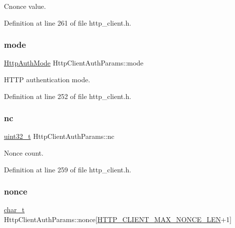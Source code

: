Cnonce value. 



Definition at line 261 of file http\+\_\+client.\+h.

\mbox{\label{structHttpClientAuthParams_add04fcf3f023b6d2ac1e38d6fd3ebe1e}} 
\subsubsection{\texorpdfstring{mode}{mode}}
{\footnotesize\ttfamily \hyperlink{http__common_8h_ad435f9e57a3351beaec6fc809eff4f31}{Http\+Auth\+Mode} Http\+Client\+Auth\+Params\+::mode}



H\+T\+TP authentication mode. 



Definition at line 252 of file http\+\_\+client.\+h.

\mbox{\label{structHttpClientAuthParams_af8657995b5e9910a6e205158eab5ada7}} 
\subsubsection{\texorpdfstring{nc}{nc}}
{\footnotesize\ttfamily \hyperlink{stdint_8h_a435d1572bf3f880d55459d9805097f62}{uint32\+\_\+t} Http\+Client\+Auth\+Params\+::nc}



Nonce count. 



Definition at line 259 of file http\+\_\+client.\+h.

\mbox{\label{structHttpClientAuthParams_aa5082a3e2626e38e3a6834bbec7299ec}} 
\subsubsection{\texorpdfstring{nonce}{nonce}}
{\footnotesize\ttfamily \hyperlink{compiler__port_8h_a40bb5262bf908c328fbcfbe5d29d0201}{char\+\_\+t} Http\+Client\+Auth\+Params\+::nonce\mbox{[}\hyperlink{http__client_8h_aca4c4b3a57b921be4b03a17e1640bebe}{H\+T\+T\+P\+\_\+\+C\+L\+I\+E\+N\+T\+\_\+\+M\+A\+X\+\_\+\+N\+O\+N\+C\+E\+\_\+\+L\+EN}+1\mbox{]}}



